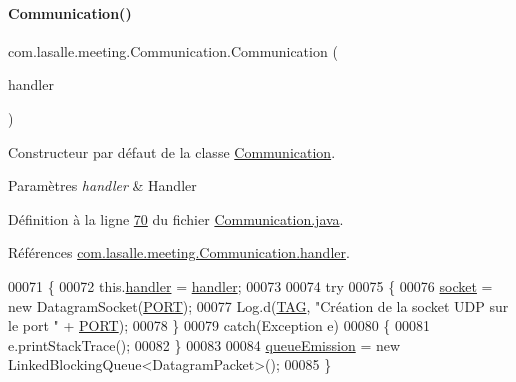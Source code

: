 \paragraph{\texorpdfstring{Communication()}{Communication()}}
{\footnotesize\ttfamily com.\+lasalle.\+meeting.\+Communication.\+Communication (\begin{DoxyParamCaption}\item[{Handler}]{handler }\end{DoxyParamCaption})}



Constructeur par défaut de la classe \hyperlink{classcom_1_1lasalle_1_1meeting_1_1_communication}{Communication}. 


\begin{DoxyParams}{Paramètres}
{\em handler} & Handler \\
\hline
\end{DoxyParams}


Définition à la ligne \hyperlink{_communication_8java_source_l00070}{70} du fichier \hyperlink{_communication_8java_source}{Communication.\+java}.



Références \hyperlink{_communication_8java_source_l00046}{com.\+lasalle.\+meeting.\+Communication.\+handler}.


\begin{DoxyCode}
00071     \{
00072         this.\hyperlink{classcom_1_1lasalle_1_1meeting_1_1_communication_a05fa5f360f28819a9e106e0265a74643}{handler} = \hyperlink{classcom_1_1lasalle_1_1meeting_1_1_communication_a05fa5f360f28819a9e106e0265a74643}{handler};
00073 
00074         \textcolor{keywordflow}{try}
00075         \{
00076             \hyperlink{classcom_1_1lasalle_1_1meeting_1_1_communication_a2a538f36640aecebbb833bbaf1f03858}{socket} = \textcolor{keyword}{new} DatagramSocket(\hyperlink{classcom_1_1lasalle_1_1meeting_1_1_communication_abf48fd6a29d87d67f4941494404f1ea7}{PORT});
00077             Log.d(\hyperlink{classcom_1_1lasalle_1_1meeting_1_1_communication_a5d58f88df1f20b4d61edbed9a82eccab}{TAG}, \textcolor{stringliteral}{"Création de la socket UDP sur le port "} + \hyperlink{classcom_1_1lasalle_1_1meeting_1_1_communication_abf48fd6a29d87d67f4941494404f1ea7}{PORT});
00078         \}
00079         \textcolor{keywordflow}{catch}(Exception e)
00080         \{
00081             e.printStackTrace();
00082         \}
00083 
00084         \hyperlink{classcom_1_1lasalle_1_1meeting_1_1_communication_a733017de1be51e6e6ebf6719009ede30}{queueEmission} = \textcolor{keyword}{new} LinkedBlockingQueue<DatagramPacket>();
00085     \}
\end{DoxyCode}


